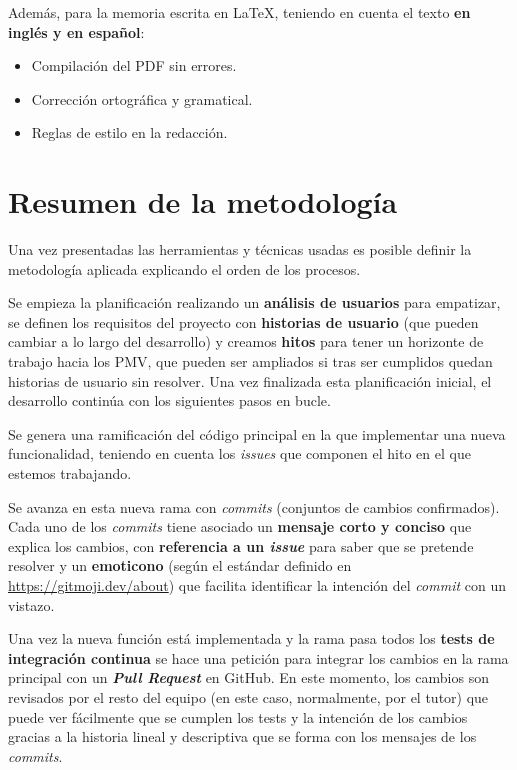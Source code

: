 Además, para la memoria escrita en LaTeX, teniendo en cuenta el texto \textbf{en inglés y en español}:
\begin{itemize}
	\item{Compilación del PDF sin errores.}
	\item{Corrección ortográfica y gramatical.}
	\item{Reglas de estilo en la redacción.}
\end{itemize}


\section{Resumen de la metodología}

Una vez presentadas las herramientas y técnicas usadas es posible definir la metodología aplicada explicando el orden de los procesos.

Se empieza la planificación realizando un \textbf{análisis de usuarios} para empatizar, se definen los requisitos del proyecto con \textbf{historias de usuario} (que pueden cambiar a lo largo del desarrollo) y creamos \textbf{hitos} para tener un horizonte de trabajo hacia los PMV, que pueden ser ampliados si tras ser cumplidos quedan historias de usuario sin resolver. Una vez finalizada esta planificación inicial, el desarrollo continúa con los siguientes pasos en bucle. 

Se genera una ramificación del código principal en la que implementar una nueva funcionalidad, teniendo en cuenta los \textit{issues} que componen el hito en el que estemos trabajando.

Se avanza en esta nueva rama con \textit{commits} (conjuntos de cambios confirmados). Cada uno de los \textit{commits} tiene asociado un \textbf{mensaje corto y conciso} que explica los cambios, con \textbf{referencia a un \textit{issue}} para saber que se pretende resolver y un \textbf{emoticono} (según el estándar definido en \url{https://gitmoji.dev/about}) que facilita identificar la intención del \textit{commit} con un vistazo.

Una vez la nueva función está implementada y la rama pasa todos los \textbf{tests de integración continua} se hace una petición para integrar los cambios en la rama principal con un \textbf{\textit{Pull Request}} en GitHub. En este momento, los cambios son revisados por el resto del equipo (en este caso, normalmente, por el tutor) que puede ver fácilmente que se cumplen los tests y la intención de los cambios gracias a la historia lineal y descriptiva que se forma con los mensajes de los \textit{commits}.

